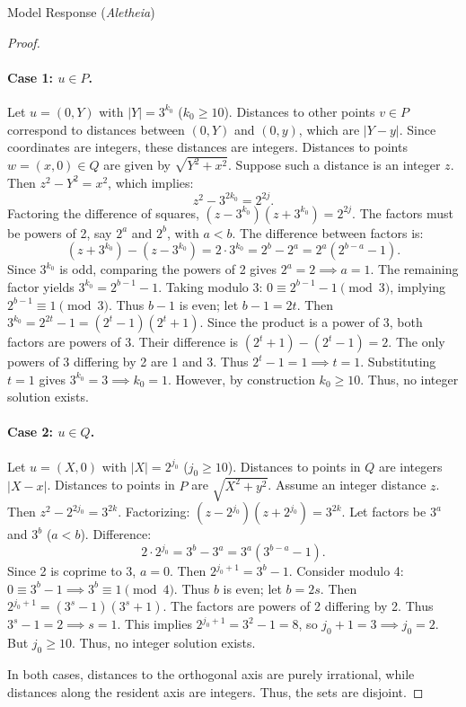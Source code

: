\documentclass[11pt]{article}
\begin{document}
\begin{solution}{Model Response (\emph{Aletheia})}
\begin{proof}
\paragraph{Case 1: $u \in P$.}
Let $u = (0, Y)$ with $|Y| = 3^{k_0}$ ($k_0 \ge 10$).
Distances to other points $v \in P$ correspond to distances between $(0, Y)$ and $(0, y)$, which are $|Y-y|$. Since coordinates are integers, these distances are integers.
Distances to points $w = (x, 0) \in Q$ are given by $\sqrt{Y^2 + x^2}$.
Suppose such a distance is an integer $z$. Then $z^2 - Y^2 = x^2$, which implies:
\[
z^2 - 3^{2k_0} = 2^{2j}.
\]
Factoring the difference of squares, $(z-3^{k_0})(z+3^{k_0}) = 2^{2j}$. The factors must be powers of 2, say $2^a$ and $2^b$, with $a < b$. The difference between factors is:
\[
(z+3^{k_0}) - (z-3^{k_0}) = 2 \cdot 3^{k_0} = 2^b - 2^a = 2^a(2^{b-a} - 1).
\]
Since $3^{k_0}$ is odd, comparing the powers of 2 gives $2^a = 2 \implies a=1$.
The remaining factor yields $3^{k_0} = 2^{b-1} - 1$.
Taking modulo 3: $0 \equiv 2^{b-1} - 1 \pmod 3$, implying $2^{b-1} \equiv 1 \pmod 3$. Thus $b-1$ is even; let $b-1 = 2t$.
Then $3^{k_0} = 2^{2t} - 1 = (2^t - 1)(2^t + 1)$.
Since the product is a power of 3, both factors are powers of 3. Their difference is $(2^t+1) - (2^t-1) = 2$.
The only powers of 3 differing by 2 are 1 and 3. Thus $2^t-1 = 1 \implies t=1$.
Substituting $t=1$ gives $3^{k_0} = 3 \implies k_0 = 1$.
However, by construction $k_0 \ge 10$. Thus, no integer solution exists.

\paragraph{Case 2: $u \in Q$.}
Let $u = (X, 0)$ with $|X| = 2^{j_0}$ ($j_0 \ge 10$).
Distances to points in $Q$ are integers $|X-x|$.
Distances to points in $P$ are $\sqrt{X^2 + y^2}$.
Assume an integer distance $z$. Then $z^2 - 2^{2j_0} = 3^{2k}$.
Factorizing: $(z-2^{j_0})(z+2^{j_0}) = 3^{2k}$.
Let factors be $3^a$ and $3^b$ ($a < b$). Difference:
\[
2 \cdot 2^{j_0} = 3^b - 3^a = 3^a(3^{b-a}-1).
\]
Since 2 is coprime to 3, $a=0$.
Then $2^{j_0+1} = 3^b - 1$.
Consider modulo 4: $0 \equiv 3^b - 1 \implies 3^b \equiv 1 \pmod 4$. Thus $b$ is even; let $b=2s$.
Then $2^{j_0+1} = (3^s-1)(3^s+1)$.
The factors are powers of 2 differing by 2.
Thus $3^s-1 = 2 \implies s=1$.
This implies $2^{j_0+1} = 3^2-1 = 8$, so $j_0+1=3 \implies j_0=2$.
But $j_0 \ge 10$. Thus, no integer solution exists.

In both cases, distances to the orthogonal axis are purely irrational, while distances along the resident axis are integers. Thus, the sets are disjoint.
\end{proof}


\end{solution}
\end{document}
